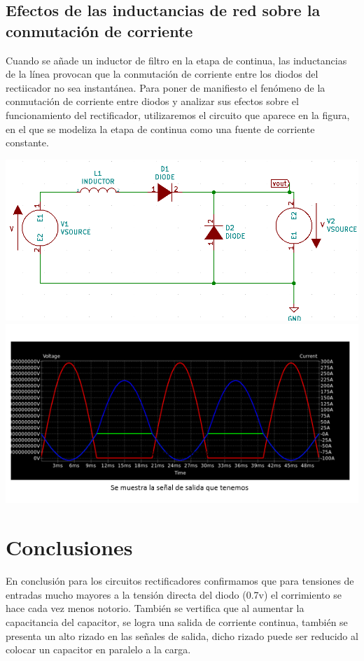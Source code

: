 \documentclass[12pt,a4paper]{article}
\begin{document}
\subsection{Efectos de las inductancias de red sobre la conmutación de corriente}
\begin{flushleft}
Cuando se añade un inductor de filtro en la etapa de continua, las inductancias de la línea provocan que la conmutación de corriente entre los diodos del rectiicador no sea instantánea. 
Para poner de manifiesto el fenómeno de la conmutación de corriente entre diodos y analizar sus efectos sobre el funcionamiento del rectificador, utilizaremos el circuito que aparece en la figura, en el que se modeliza la etapa de continua como una fuente de corriente constante.
\begin{center}
\includegraphics[scale=0.7]{imagenes/p7/Circuito7.png} 
\includegraphics[scale=1]{imagenes/p7/onda.PNG} 
\end{center}
\end{flushleft}
\newpage
\section{Conclusiones}
\begin{flushleft}
En conclusión para los circuitos rectificadores confirmamos que para tensiones de entradas mucho mayores a la tensión directa del diodo (0.7v) el corrimiento se hace cada vez menos notorio. 
También se vertifica que al aumentar la capacitancia del capacitor, se logra una salida de corriente continua, también se presenta un alto rizado en las señales de salida, dicho rizado puede ser reducido al colocar un capacitor en paralelo a la carga.
\end{flushleft}
\end{document}
